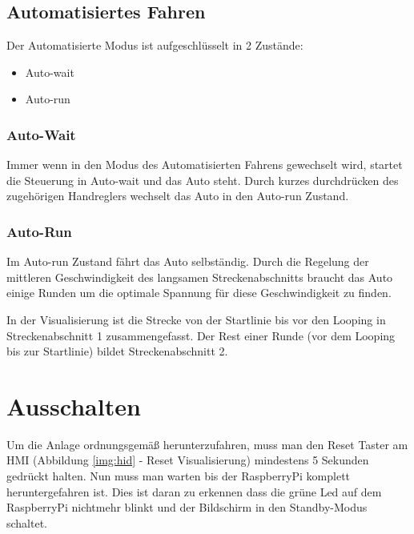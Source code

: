 \documentclass[a4paper, 11pt]{report}
\begin{document}
	\subsection{Automatisiertes Fahren}
		Der Automatisierte Modus ist aufgeschlüsselt in 2 Zustände:
		\begin{itemize}
			\item Auto-wait
			\item Auto-run
		\end{itemize}
		\subsubsection{Auto-Wait}
		Immer wenn in den Modus des Automatisierten Fahrens gewechselt wird, startet die Steuerung in
		Auto-wait und das Auto steht.
		Durch kurzes durchdrücken des zugehörigen Handreglers wechselt das Auto in den Auto-run Zustand.
		\subsubsection{Auto-Run}
			Im Auto-run Zustand fährt das Auto selbständig. Durch die Regelung der mittleren Geschwindigkeit des langsamen Streckenabschnitts braucht das Auto einige Runden um die optimale Spannung für diese Geschwindigkeit zu finden.

			In der Visualisierung ist die Strecke von der Startlinie bis vor den Looping in Streckenabschnitt 1 zusammengefasst.
			Der Rest einer Runde (vor dem Looping bis zur Startlinie) bildet Streckenabschnitt 2.
\section{Ausschalten}
Um die Anlage ordnungsgemäß herunterzufahren, muss man den Reset Taster am HMI (Abbildung \ref{img:hid} - Reset Visualisierung) mindestens 5 Sekunden gedrückt halten.
Nun muss man warten bis der RaspberryPi komplett heruntergefahren ist. Dies ist daran zu erkennen dass die grüne Led auf dem RaspberryPi nichtmehr blinkt und der Bildschirm in den Standby-Modus schaltet.
\end{document}
